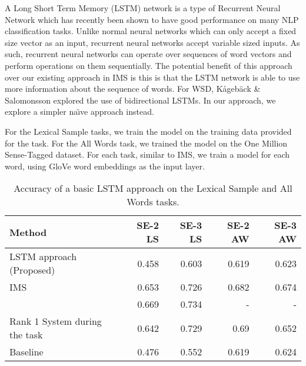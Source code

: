 A Long Short Term Memory (LSTM) network is a type of Recurrent Neural
Network which has recently been shown to have good performance on many
NLP classification tasks. Unlike normal neural networks which can only
accept a fixed size vector as an input, recurrent neural networks
accept variable sized inputs. As such, recurrent neural networks can
operate over sequences of word vectors and perform operations on them
sequentially. The potential benefit of this approach over our existing
approach in IMS is this is that the LSTM  network is able to use more 
information about the sequence of words. 
For WSD, K{\aa}geb{\"a}ck \& Salomonsson \cite{kaageback2016word} explored the use of bidirectional LSTMs. In our approach, we explore a simpler
na\"{\i}ve approach instead.

For the Lexical Sample tasks, we train the model on the training data
provided for the task. For the All Words task, we trained the model on
the One Million Sense-Tagged dataset. For each task, similar to IMS,
we train a model for each word, using GloVe word embeddings as the input layer.

\begin{table}[th]
	\caption{Accuracy of a basic LSTM approach on the Lexical
          Sample and All Words tasks.}
	\label{table:NN-LS}
	\begin{center}
		\begin{tabular}{| p{6cm} | r | r | r | r |}
			\hline
			\textbf{Method} & \textbf{SE-2 LS}  & \textbf{SE-3 LS} & \textbf{SE-2 AW}  & \textbf{SE-3 AW} \\
			\hline
			LSTM approach (Proposed) & 0.458  & 0.603 & 0.619 & 0.623 \\
			\hline
			IMS & 0.653 & 0.726 & 0.682 & 0.674 \\
            \hline
            \cite{kaageback2016word} & 0.669 & 0.734 & - & - \\
			\hline
			Rank 1 System during the task & 0.642 & 0.729 & 0.69 & 0.652 \\
			\hline
			Baseline & 0.476 & 0.552 & 0.619 & 0.624 \\
			\hline
		\end{tabular}
	\end{center}
\end{table}

